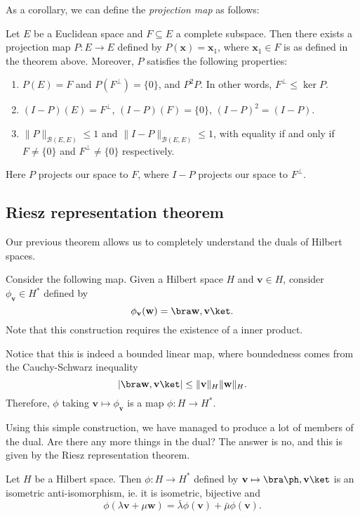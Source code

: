 \documentclass[a4paper]{article}
\begin{document}
As a corollary, we can define the \emph{projection map} as follows:
\begin{cor}
  Let $E$ be a Euclidean space and $F\subseteq E$ a complete subspace. Then there exists a projection map $P: E \to E$ defined by $P(\mathbf{x}) = \mathbf{x}_1$, where $\mathbf{x}_1 \in F$ is as defined in the theorem above. Moreover, $P$ satisfies the following properties:
  \begin{enumerate}
    \item $P(E) = F$ and $P(F^\perp) = \{0\}$, and $P^2 P$. In other words, $F^\perp \leq \ker P$.
    \item $(I - P)(E) = F^{\perp}$, $(I - P)(F) = \{0\}$, $(I - P)^2 = (I - P)$.
    \item $\|P\|_{\mathcal{B}(E, E)} \leq 1$ and $\|I - P\|_{\mathcal{B}(E, E)} \leq 1$, with equality if and only if $F \not= \{0\}$ and $F^{\perp} \not= \{0\}$ respectively.
  \end{enumerate}
\end{cor}
Here $P$ projects our space to $F$, where $I - P$ projects our space to $F^\perp$.

\subsection{Riesz representation theorem}
Our previous theorem allows us to completely understand the duals of Hilbert spaces.

Consider the following map. Given a Hilbert space $H$ and $\mathbf{v} \in H$, consider $\phi_{\mathbf{v}} \in H^*$ defined by
\[
  \phi_{\mathbf{v}}(\mathbf{w}) = \bra \mathbf{w}, \mathbf{v}\ket.
\]
Note that this construction requires the existence of a inner product.

Notice that this is indeed a bounded linear map, where boundedness comes from the Cauchy-Schwarz inequality
\[
  |\bra \mathbf{w}, \mathbf{v}\ket| \leq \|\mathbf{v}\|_H \|\mathbf{w}\|_H.
\]
Therefore, $\phi$ taking $\mathbf{v} \mapsto \phi_{\mathbf{v}}$ is a map $\phi: H \to H^*$.

Using this simple construction, we have managed to produce a lot of members of the dual. Are there any more things in the dual? The answer is no, and this is given by the Riesz representation theorem.
\begin{prop}
  Let $H$ be a Hilbert space. Then $\phi: H\to H^*$ defined by $\mathbf{v} \mapsto \bra \ph, \mathbf{v}\ket$ is an isometric anti-isomorphism, ie. it is isometric, bijective and
  \[
    \phi(\lambda \mathbf{v} + \mu \mathbf{w}) = \bar{\lambda} \phi(\mathbf{v}) + \bar{\mu} \phi(\mathbf{v}).
  \]
\end{prop}
\end{document}

